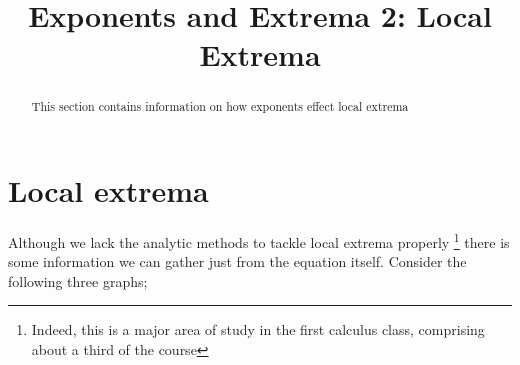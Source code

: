 \documentclass{ximeraXloud}
\title{Exponents and Extrema 2: Local Extrema}
\begin{document}
\begin{abstract}
    This section contains information on how exponents effect local extrema
\end{abstract}
\maketitle


\section*{Local extrema}

Although we lack the analytic methods to tackle local extrema properly%
\footnote{Indeed, this is a major area of study in the first calculus class, comprising about a third of the course}
there is some information we can gather just from the equation itself. Consider the following three graphs;
\end{document}
